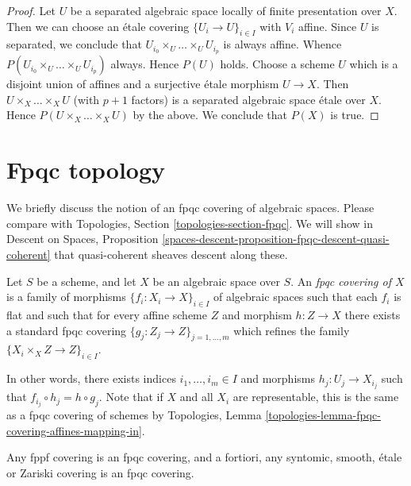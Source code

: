 \begin{proof}
Let $U$ be a separated algebraic space locally of finite presentation over $X$.
Then we can choose an \'etale covering $\{U_i \to U\}_{i \in I}$ with $V_i$
affine. Since $U$ is separated, we conclude that
$U_{i_0} \times_U \ldots \times_U U_{i_p}$ is always affine.
Whence $P(U_{i_0} \times_U \ldots \times_U U_{i_p})$ always.
Hence $P(U)$ holds. Choose a scheme $U$ which is a disjoint union of
affines and a surjective \'etale morphism $U \to X$.
Then $U \times_X \ldots \times_X U$ (with $p + 1$ factors)
is a separated algebraic space
\'etale over $X$. Hence $P(U \times_X \ldots \times_X U)$ by the above.
We conclude that $P(X)$ is true.
\end{proof}












\section{Fpqc topology}
\label{section-fpqc}

\noindent
We briefly discuss the notion of an fpqc covering of algebraic spaces.
Please compare with
Topologies, Section \ref{topologies-section-fpqc}.
We will show in
Descent on Spaces,
Proposition \ref{spaces-descent-proposition-fpqc-descent-quasi-coherent}
that quasi-coherent sheaves descent along these.

\begin{definition}
\label{definition-fpqc-covering}
Let $S$ be a scheme, and let $X$ be an algebraic space over $S$.
An {\it fpqc covering of $X$} is a family of morphisms
$\{f_i : X_i \to X\}_{i \in I}$ of algebraic spaces
such that each $f_i$ is flat and such that for every affine scheme
$Z$ and morphism $h : Z \to X$ there exists a standard fpqc covering
$\{g_j : Z_j \to Z\}_{j = 1, \ldots, m}$ which refines the family
$\{X_i \times_X Z \to Z\}_{i \in I}$.
\end{definition}

\noindent
In other words, there exists indices $i_1, \ldots, i_m \in I$ and
morphisms $h_j : U_j \to X_{i_j}$ such that
$f_{i_j} \circ h_j = h \circ g_j$. Note that if $X$ and all $X_i$ are
representable, this is the same as a fpqc covering of schemes by
Topologies, Lemma \ref{topologies-lemma-fpqc-covering-affines-mapping-in}.

\begin{lemma}
\label{lemma-zariski-etale-smooth-syntomic-fppf-fpqc}
Any fppf covering is an fpqc covering, and a fortiori,
any syntomic, smooth, \'etale or Zariski covering is an fpqc covering.
\end{lemma}

